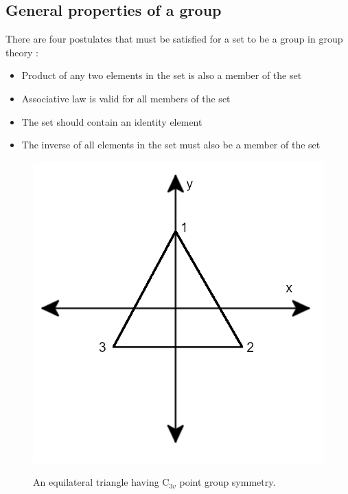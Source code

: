 \documentclass[10pt,doublespacing,edeposit]{uiucthesis2020}
\begin{document}
\begin{mainmatter}
\subsection{General properties of a group}


There are four postulates that must be satisfied for a set to be a group in group theory \cite{Koster1956}:

\begin{itemize}
\item Product of any two elements in the set is also a member of the set
\item Associative law is valid for all members of the set
\item The set should contain an identity element
\item The inverse of all elements in the set must also be a member of the set
\end{itemize}


\begin{figure}
\centering\includegraphics[width=0.5\columnwidth]{figures/ch4/equilateral_triangle.png} \\
\caption{\label{fig:C3v}
An equilateral triangle having C$_{3v}$ point group symmetry.
}
\end{figure}



\end{mainmatter}
\end{document}
